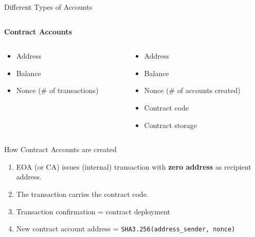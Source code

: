 \documentclass[handout]{beamer}
\begin{document}
\begin{frame}{Different Types of Accounts}
\begin{columns}[T]
\begin{column}{0.45\textwidth}
			\textbf{Contract Accounts}
		\end{column}
	\end{columns}  
\vspace{1em}
	\begin{columns}[T]
		\begin{column}{0.45\textwidth}
			\begin{itemize}
				\item Address
				\item Balance
				\item Nonce (\# of transactions)
			\end{itemize}
		\end{column}
		\begin{column}{0.45\textwidth}
			\begin{itemize}
				\item Address
				\item Balance
				\item Nonce (\# of accounts created)
				\item Contract code
				\item Contract storage
			\end{itemize}
		\end{column}
	\end{columns}
\vspace{1em}
\end{frame}


\begin{frame}{How Contract Accounts are created}

	
\vspace{1em}
	\begin{enumerate}
				\item<1-> EOA (or CA) issues (internal) transaction with \textcolor{focus}{\textbf{zero address}} as recipient address.
				\item<2-> The transaction carries the contract code.
				\item<3-> Transaction confirmation = contract deployment
				\item<4-> New contract account address = \texttt{SHA3.256(address\_sender, nonce)} %
	\end{enumerate}
			
\end{frame}
\end{document}
